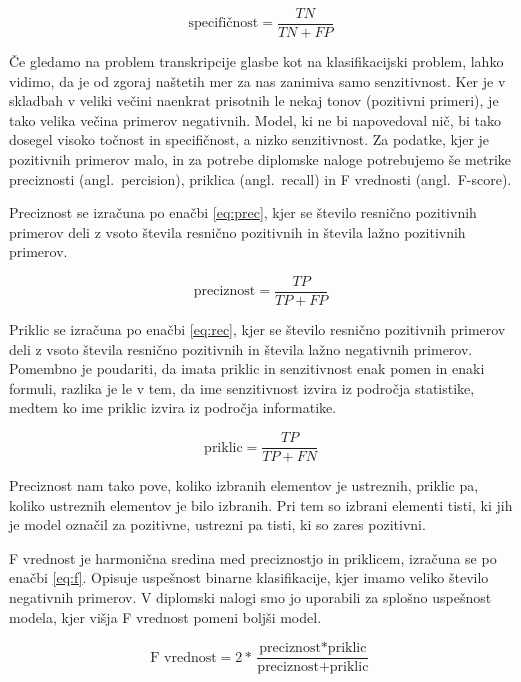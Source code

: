 \documentclass[a4paper, 12pt, openright]{book}
\newcommand{\en}{angl.}
\begin{document}
\begin{equation}
\label{eq:spec}
   \text{specifičnost} = \frac{TN}{TN+FP}
\end{equation}

Če gledamo na problem transkripcije glasbe kot na klasifikacijski problem, lahko vidimo, da je od zgoraj naštetih mer za nas zanimiva samo senzitivnost.
Ker je v skladbah v veliki večini naenkrat prisotnih le nekaj tonov (pozitivni primeri), je tako velika večina primerov negativnih.
Model, ki ne bi napovedoval nič, bi tako dosegel visoko točnost in specifičnost, a nizko senzitivnost.
Za podatke, kjer je pozitivnih primerov malo, in za potrebe diplomske naloge potrebujemo še metrike preciznosti (\en\ percision), priklica (\en\ recall) in F vrednosti (\en\ F-score).

Preciznost se izračuna po enačbi \ref{eq:prec}, kjer se število resnično pozitivnih primerov deli z vsoto števila resnično pozitivnih in števila lažno pozitivnih primerov.

\begin{equation}
\label{eq:prec}
    \text{preciznost} = \frac{TP}{TP+FP}
\end{equation}

Priklic se izračuna po enačbi \ref{eq:rec}, kjer se število resnično pozitivnih primerov deli z vsoto števila resnično pozitivnih in števila lažno negativnih primerov.
Pomembno je poudariti, da imata priklic in senzitivnost enak pomen in enaki formuli, razlika je le v tem, da ime senzitivnost izvira iz področja statistike, medtem ko ime priklic izvira iz področja informatike.

\begin{equation}
\label{eq:rec}
    \text{priklic} = \frac{TP}{TP+FN}
\end{equation}

Preciznost nam tako pove, koliko izbranih elementov je ustreznih, priklic pa, koliko ustreznih elementov je bilo izbranih. Pri tem so izbrani elementi tisti, ki jih je model označil za pozitivne, ustrezni pa tisti, ki so zares pozitivni.

F vrednost je harmonična sredina med preciznostjo in priklicem, izračuna se po enačbi \ref{eq:f}.
Opisuje uspešnost binarne klasifikacije, kjer imamo veliko število negativnih primerov.
V diplomski nalogi smo jo uporabili za splošno uspešnost modela, kjer višja F vrednost pomeni boljši model.

\begin{equation}
\label{eq:f}
    \text{F vrednost} = 2 * \frac{\text{preciznost} * \text{priklic}}{\text{preciznost} + \text{priklic}}
\end{equation}
\end{document}
